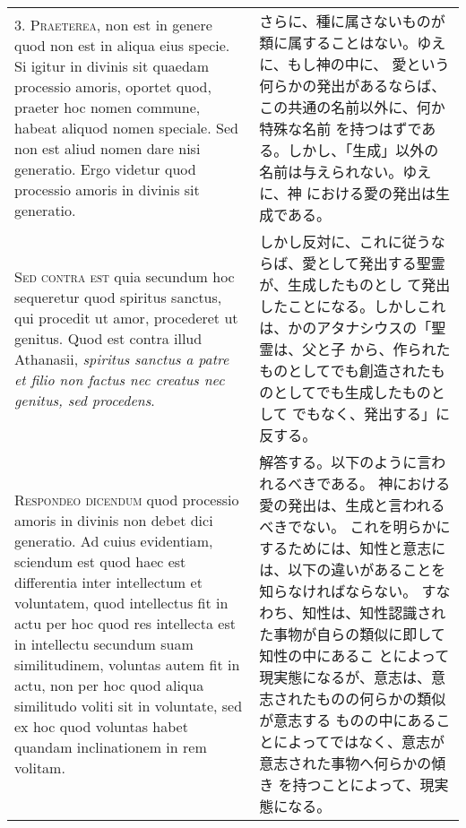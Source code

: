 \documentclass[10pt]{jsarticle} %
\begin{document}
\begin{longtable}{p{21em}p{21em}}
\\



3. {\scshape Praeterea}, non est in genere quod non est in aliqua eius
 specie. Si igitur in divinis sit quaedam processio amoris, oportet
 quod, praeter hoc nomen commune, habeat aliquod nomen speciale. Sed non
 est aliud nomen dare nisi generatio. Ergo videtur quod processio amoris
 in divinis sit generatio.



&

さらに、種に属さないものが類に属することはない。ゆえに、もし神の中に、
 愛という何らかの発出があるならば、この共通の名前以外に、何か特殊な名前
 を持つはずである。しかし、「生成」以外の名前は与えられない。ゆえに、神
 における愛の発出は生成である。


\\



{\scshape Sed contra est} quia secundum hoc sequeretur quod spiritus
 sanctus, qui procedit ut amor, procederet ut genitus. Quod est contra
 illud Athanasii, {\itshape spiritus sanctus a patre et filio non factus nec
 creatus nec genitus, sed procedens}.



&

しかし反対に、これに従うならば、愛として発出する聖霊が、生成したものとし
 て発出したことになる。しかしこれは、かのアタナシウスの「聖霊は、父と子
 から、作られたものとしてでも創造されたものとしてでも生成したものとして
 でもなく、発出する」に反する。



\\



{\scshape Respondeo dicendum} quod processio amoris in divinis non debet dici
 generatio. Ad cuius evidentiam, sciendum est quod haec est differentia
 inter intellectum et voluntatem, quod intellectus fit in actu per hoc
 quod res intellecta est in intellectu secundum suam similitudinem,
 voluntas autem fit in actu, non per hoc quod aliqua similitudo voliti
 sit in voluntate, sed ex hoc quod voluntas habet quandam inclinationem
 in rem volitam. 


&

解答する。以下のように言われるべきである。
神における愛の発出は、生成と言われるべきでない。
これを明らかにするためには、知性と意志には、以下の違いがあることを知らなければならない。
すなわち、知性は、知性認識された事物が自らの類似に即して知性の中にあるこ
 とによって現実態になるが、意志は、意志されたものの何らかの類似が意志する
 ものの中にあることによってではなく、意志が意志された事物へ何らかの傾き
 を持つことによって、現実態になる。




\end{longtable}
\end{document}
